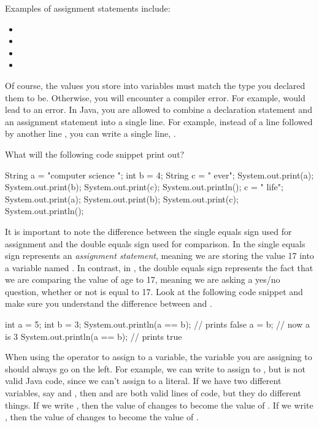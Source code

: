 \noindent Examples of assignment statements include:
\begin{itemize}
 \item {}
 \item {}
 \item {}
 \item {}
\end{itemize}
	Of course, the values you store into variables must match the type you declared them to be. Otherwise, you will encounter a compiler error. For example,  would lead to an error.	
In Java, you are allowed to combine a declaration statement and an assignment statement into a single line. For example, instead of a line  followed by another line , you can write a single line, .	
\begin{exercise}	
  What will the following code snippet print out?	
  \begin{code}	
    String a = "computer  science ";	
    int b = 4;	
    String c = " ever";	
    System.out.print(a);	
    System.out.print(b);	
    System.out.print(c);	
    System.out.println();	
    c = " life";	
    System.out.print(a);	
    System.out.print(b);	
    System.out.print(c);	
    System.out.println();	
  \end{code}	
\end{exercise}	
It is important to note the difference between the single equals sign used for assignment and the double equals sign used for comparison. In  the single equals sign represents an \emph{assignment statement}, meaning we are storing the value 17 into a variable named . In contrast, in , the double equals sign represents the fact that we are comparing the value of age to 17, meaning we are asking a yes/no question, whether or not  is equal to 17. Look at the following code snippet and make sure you understand the difference between \ic{=} and \ic{==}.	
\begin{code}	
  int a = 5;	
  int b = 3;	
  System.out.println(a == b);   // prints false	
  a = b;                        // now a is 3	
  System.out.println(a == b);   // prints true	
\end{code}	
When using the \ic{=} operator to assign to a variable, the variable you are assigning to should always go on the left. For example, we can write  to assign  to , but  is not valid Java code, since we can't assign to a literal. If we have two different variables, say  and , then  and  are both valid lines of code, but they do different things. If we write , then the value of  changes to become the value of . If we write , then the value of  changes to become the value of .	
